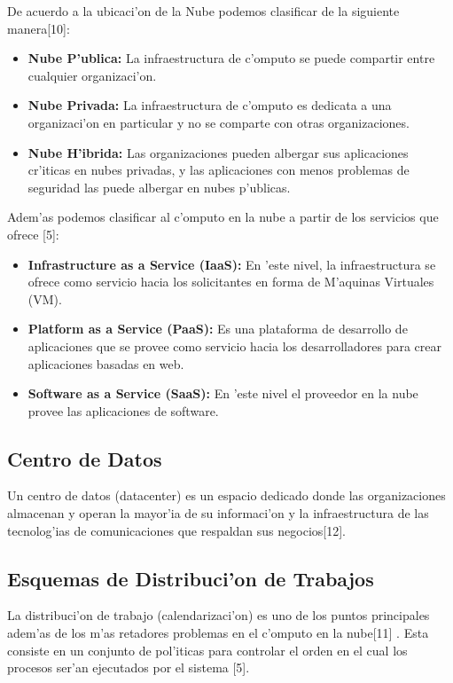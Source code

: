 De acuerdo a la ubicaci'on de la Nube podemos clasificar de la siguiente manera[10]:
\begin{itemize}
\item \textbf{Nube P'ublica:} La infraestructura de c'omputo se puede compartir entre cualquier organizaci'on.
\item \textbf{Nube Privada:} La infraestructura de c'omputo es dedicata a una organizaci'on en particular y no se comparte con otras organizaciones.
\item \textbf{Nube H'ibrida:} Las organizaciones pueden albergar sus aplicaciones cr'iticas en nubes privadas, y las aplicaciones con menos problemas de seguridad las puede albergar en nubes p'ublicas.
\end{itemize}
Adem'as podemos clasificar al c'omputo en la nube a partir de los servicios que ofrece [5]: 
\begin{itemize}
\item \textbf{Infrastructure as a Service (IaaS):} En 'este nivel, la infraestructura se ofrece como servicio hacia los solicitantes en forma de M'aquinas Virtuales (VM).
\item \textbf{Platform as a Service (PaaS):} Es una plataforma de desarrollo de aplicaciones que se provee como servicio hacia los desarrolladores para crear aplicaciones basadas en web.
\item \textbf{Software as a Service (SaaS):} En 'este nivel el proveedor en la nube provee las aplicaciones de software.
\end{itemize}

\subsection*{Centro de Datos}
Un centro de datos (datacenter) es un espacio dedicado donde las organizaciones almacenan y operan la mayor'ia de su informaci'on y la infraestructura de las tecnolog'ias de comunicaciones que respaldan sus negocios[12].

\subsection*{Esquemas de Distribuci'on de Trabajos}

La distribuci'on de trabajo (calendarizaci'on) es uno de los puntos principales adem'as de los m'as retadores problemas en el c'omputo en la nube[11] . Esta consiste en un conjunto de pol'iticas para controlar el orden en el cual los procesos ser'an ejecutados por el sistema [5].

